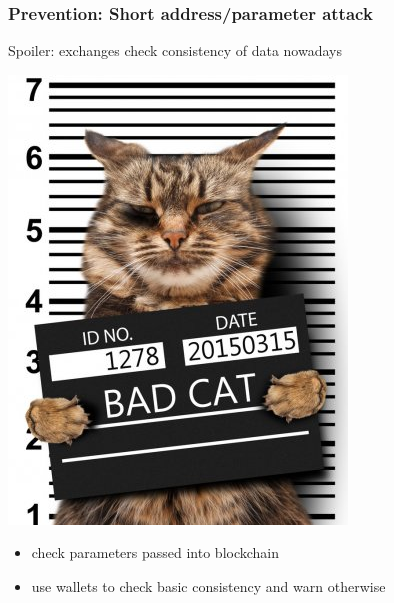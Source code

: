 \documentclass[11pt]{beamer}  %
\begin{document}
\begin{frame}\frametitle{Prevention: Short address/parameter attack}

  \begin{greenbox}{Spoiler: exchanges check consistency of data nowadays}
    \begin{center}
      \includegraphics[scale=0.32,clip=false]{pictures/cat-jail.jpg}
    \end{center}
  \end{greenbox}

  \bigskip

  \begin{itemize}
  \item check parameters passed into blockchain
  \item use wallets to check basic consistency and warn otherwise
  \end{itemize}
  
\end{frame}
\end{document}
